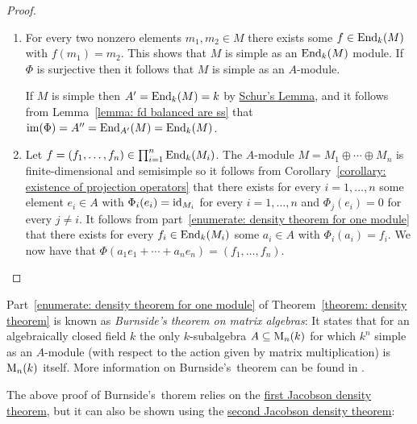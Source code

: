 \begin{proof}
  \leavevmode
  \begin{enumerate}
    \item
      For every two nonzero elements $m_1, m_2 \in M$ there exists some $f \in \operatorname{End}_k(M)$ with $f(m_1) = m_2$.
      This shows that $M$ is simple as an $\operatorname{End}_k(M)$ module.
      If $\Phi$ is surjective then it follows that $M$ is simple as an $A$-module.
      
      If $M$ is simple then $A' = \operatorname{End}_k(M) = k$ by \hyperref[proposition: schurs lemma for modules]{Schur’s Lemma}, and it follows from Lemma~\ref{lemma: fd balanced are ss} that $\operatorname{im}(\Phi) = A'' = \operatorname{End}_{A'}(M) = \operatorname{End}_k(M)$.
    \item
      Let $f = (f_1, \dotsc, f_n) \in \prod_{i=1}^n \operatorname{End}_k(M_i)$.
      The $A$-module $M = M_1 \oplus \dotsb \oplus M_n$ is finite-dimensional and semisimple so it follows from Corollary~\ref{corollary: existence of projection operators} that there exists for every $i = 1, \dotsc, n$ some element $e_i \in A$ with $\Phi_i(e_i) = \operatorname{id}_{M_i}$ for every $i = 1, \dotsc, n$ and $\Phi_j(e_i) = 0$ for every $j \neq i$.
      It follows from part~\ref*{enumerate: density theorem for one module} that there exists for every $f_i \in \operatorname{End}_k(M_i)$ some $a_i \in A$ with $\Phi_i(a_i) = f_i$.
      We now have that $\Phi(a_1 e_1 + \dotsb + a_n e_n) = (f_1, \dotsc, f_n)$.
    \qedhere
  \end{enumerate}
\end{proof}



\begin{remark}
  Part~\ref*{enumerate: density theorem for one module} of Theorem~\ref{theorem: density theorem} is known as \emph{Burnside’s theorem on matrix algebras}:
  It states that for an algebraically closed field $k$ the only $k$-subalgebra $A \subseteq \operatorname{M}_n(k)$ for which $k^n$ simple as an $A$-module (with respect to the action given by matrix multiplication) is $\operatorname{M}_n(k)$ itself.
  More information on Burnside’s~theorem can be found in \cite{ShapiroBurnside}.
  
  The above proof of Burnside’s~thorem  relies on the \hyperref[theorem: first jacobson density theorem]{first Jacobson density theorem}, but it can also be shown using the \hyperref[theorem: second jacobson density theorem]{second Jacobson density theorem}:
\end{remark}


